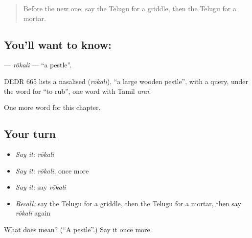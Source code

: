\begin{quote}
Before the new one: say the Telugu for a griddle, then the Telugu for a mortar.
\end{quote}

\subsection*{You'll want to know: }
\textbf{} — \emph{rōkali} — \textquotedblleft{}a pestle\textquotedblright{}.

\begin{cousinweb}
DEDR 665 lists a nasalised \textbf{} (\emph{rōkali}), \textquotedblleft{}a large wooden pestle\textquotedblright{}, with a query, under the word for \textquotedblleft{}to rub\textquotedblright{}, one word with Tamil \emph{urai}.
\end{cousinweb}

\begin{grammarlens}[title={What you've built}]
One more word for this chapter.
\end{grammarlens}

\subsection*{Your turn}
\begin{itemize}
\raggedright
  \item \emph{Say it:} \emph{rōkali}
  \item \emph{Say it:} \emph{rōkali}, once more
  \item \emph{Say it:} say \emph{rōkali}
  \item \emph{Recall:} say the Telugu for a griddle, then the Telugu for a mortar, then say \emph{rōkali} again
\end{itemize}

\begin{tcolorbox}[breakable,colback=teal!4,colframe=teal!35!black,title={Before you move on}]
What does  mean? (\textquotedblleft{}A pestle\textquotedblright{}.) Say it once more.
\end{tcolorbox}
